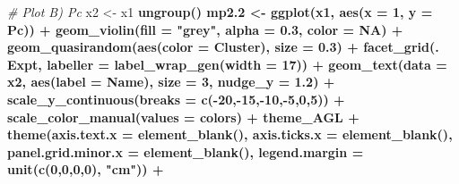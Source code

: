 \documentclass[
]{article}
\newenvironment{Shaded}{\begin{snugshade}}{\end{snugshade}}
\newcommand{\CommentTok}[1]{\textcolor[rgb]{0.56,0.35,0.01}{\textit{#1}}}
\newcommand{\DataTypeTok}[1]{\textcolor[rgb]{0.13,0.29,0.53}{#1}}
\newcommand{\DecValTok}[1]{\textcolor[rgb]{0.00,0.00,0.81}{#1}}
\newcommand{\FloatTok}[1]{\textcolor[rgb]{0.00,0.00,0.81}{#1}}
\newcommand{\KeywordTok}[1]{\textcolor[rgb]{0.13,0.29,0.53}{\textbf{#1}}}
\newcommand{\NormalTok}[1]{#1}
\newcommand{\OperatorTok}[1]{\textcolor[rgb]{0.81,0.36,0.00}{\textbf{#1}}}
\newcommand{\OtherTok}[1]{\textcolor[rgb]{0.56,0.35,0.01}{#1}}
\newcommand{\StringTok}[1]{\textcolor[rgb]{0.31,0.60,0.02}{#1}}
\begin{document}
\begin{Shaded}
\begin{Highlighting}[]
{{{{{{{{{{{{{\CommentTok{# Plot B) Pc}
\NormalTok{x2 <-}\StringTok{ }\NormalTok{x1 }\OperatorTok{%
\StringTok{  }\KeywordTok{ungroup}\NormalTok{() }\OperatorTok{%
\NormalTok{mp2}\FloatTok{.2}\NormalTok{ <-}\StringTok{ }\KeywordTok{ggplot}\NormalTok{(x1, }\KeywordTok{aes}\NormalTok{(}\DataTypeTok{x =} \DecValTok{1}\NormalTok{, }\DataTypeTok{y =}\NormalTok{ Pc)) }\OperatorTok{+}\StringTok{ }
\StringTok{  }\KeywordTok{geom_violin}\NormalTok{(}\DataTypeTok{fill =} \StringTok{"grey"}\NormalTok{, }\DataTypeTok{alpha =} \FloatTok{0.3}\NormalTok{, }\DataTypeTok{color =} \OtherTok{NA}\NormalTok{) }\OperatorTok{+}\StringTok{ }
\StringTok{  }\KeywordTok{geom_quasirandom}\NormalTok{(}\KeywordTok{aes}\NormalTok{(}\DataTypeTok{color =}\NormalTok{ Cluster), }\DataTypeTok{size =} \FloatTok{0.3}\NormalTok{) }\OperatorTok{+}\StringTok{ }
\StringTok{  }\KeywordTok{facet_grid}\NormalTok{(. }\OperatorTok{~}\StringTok{ }\NormalTok{Expt, }\DataTypeTok{labeller =} \KeywordTok{label_wrap_gen}\NormalTok{(}\DataTypeTok{width =} \DecValTok{17}\NormalTok{)) }\OperatorTok{+}
\StringTok{  }\KeywordTok{geom_text}\NormalTok{(}\DataTypeTok{data =}\NormalTok{ x2, }\KeywordTok{aes}\NormalTok{(}\DataTypeTok{label =}\NormalTok{ Name), }\DataTypeTok{size =} \DecValTok{3}\NormalTok{, }\DataTypeTok{nudge_y =} \FloatTok{1.2}\NormalTok{) }\OperatorTok{+}
\StringTok{  }\KeywordTok{scale_y_continuous}\NormalTok{(}\DataTypeTok{breaks =} \KeywordTok{c}\NormalTok{(}\OperatorTok{-}\DecValTok{20}\NormalTok{,}\OperatorTok{-}\DecValTok{15}\NormalTok{,}\OperatorTok{-}\DecValTok{10}\NormalTok{,}\OperatorTok{-}\DecValTok{5}\NormalTok{,}\DecValTok{0}\NormalTok{,}\DecValTok{5}\NormalTok{)) }\OperatorTok{+}
\StringTok{  }\KeywordTok{scale_color_manual}\NormalTok{(}\DataTypeTok{values =}\NormalTok{ colors) }\OperatorTok{+}
\StringTok{  }\NormalTok{theme_AGL }\OperatorTok{+}
\StringTok{  }\KeywordTok{theme}\NormalTok{(}\DataTypeTok{axis.text.x        =} \KeywordTok{element_blank}\NormalTok{(),}
        \DataTypeTok{axis.ticks.x       =} \KeywordTok{element_blank}\NormalTok{(),}
        \DataTypeTok{panel.grid.minor.x =} \KeywordTok{element_blank}\NormalTok{(),}
        \DataTypeTok{legend.margin =} \KeywordTok{unit}\NormalTok{(}\KeywordTok{c}\NormalTok{(}\DecValTok{0}\NormalTok{,}\DecValTok{0}\NormalTok{,}\DecValTok{0}\NormalTok{,}\DecValTok{0}\NormalTok{), }\StringTok{"cm"}\NormalTok{)) }\OperatorTok{+}
}}}}}}}}}}}}}}}
\end{Highlighting}
\end{Shaded}
\end{document}
